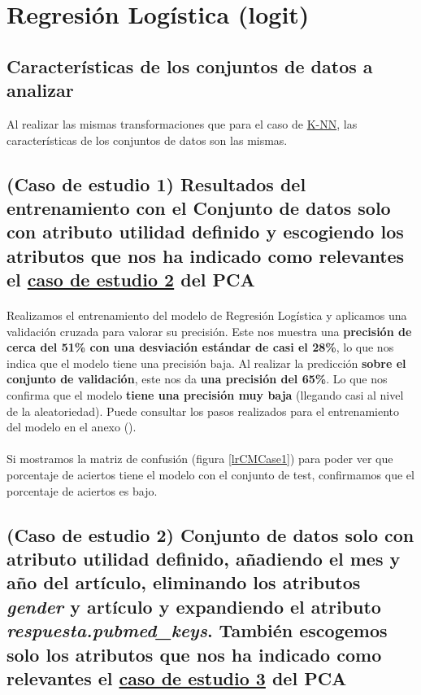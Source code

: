 \section{Regresión Logística (logit)}
\label{resultados:lr}

\subsection{Características de los conjuntos de datos a analizar}
\label{resultados:lr_caracteristicas}
Al realizar las mismas transformaciones que para el caso de \hyperref[resultados:knn_caracteristicas]{K-NN}, las características de los conjuntos de datos son las mismas.

\subsection{(Caso de estudio 1) Resultados del entrenamiento con el Conjunto de datos solo con atributo utilidad definido y escogiendo los atributos que nos ha indicado como relevantes el \hyperref[result:pca_case2]{caso de estudio 2} del PCA}

\paragraph{}
Realizamos el entrenamiento del modelo de Regresión Logística\cite{ref:lr_def} y aplicamos una validación cruzada\cite{ref:lr_cross_validation} para valorar su precisión. Este nos muestra una \textbf{precisión de cerca del 51\% con una desviación estándar de casi el 28\%}, lo que nos indica que el modelo tiene una precisión baja. Al realizar la predicción \textbf{sobre el conjunto de validación}, este nos da \textbf{una precisión del 65\%}. Lo que nos confirma que el modelo \textbf{tiene una precisión muy baja} (llegando casi al nivel de la aleatoriedad). Puede consultar los pasos realizados para el entrenamiento del modelo en el anexo ().

\paragraph{}
Si mostramos la matriz de confusión\cite{ref:confusion_matrix} (figura \ref{lrCMCase1}) para poder ver que porcentaje de aciertos tiene el modelo con el conjunto de test, confirmamos que el porcentaje de aciertos es bajo.

\subsection{(Caso de estudio 2) Conjunto de datos solo con atributo utilidad definido, añadiendo el mes y año del artículo, eliminando los atributos \textit{gender} y artículo y expandiendo el atributo \textit{respuesta.pubmed\_keys}. También escogemos solo los atributos que nos ha indicado como relevantes el \hyperref[result:pca_case3]{caso de estudio 3} del PCA}

